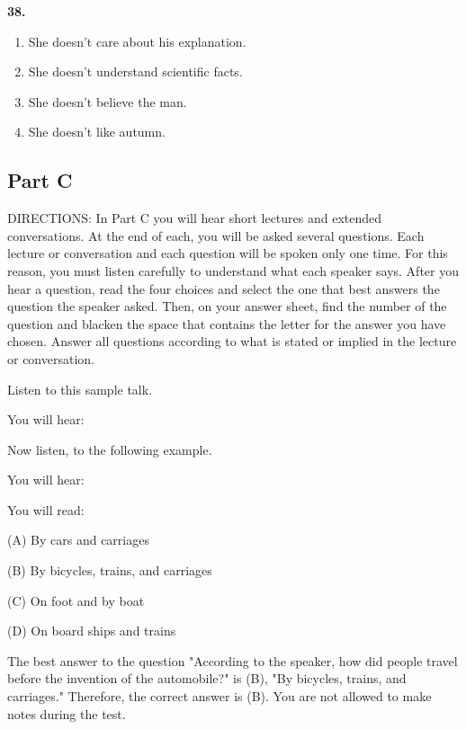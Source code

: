 \documentclass[12pt]{article}
\begin{document}
\par
\vspace{0.25\baselineskip}
\noindent\textbf{38.}
\begin{enumerate}[label=(\Alph*),leftmargin=*,itemsep=0.2em]
\item She doesn't care about his explanation.
\item She doesn't understand scientific facts.
\item She doesn't believe the man.
\item She doesn't like autumn.
\end{enumerate}
\par
\vspace{0.25\baselineskip}
\subsection*{Part C}
DIRECTIONS: In Part C you will hear short lectures and extended conversations. At the end of each, you will be asked several questions. Each lecture or conversation and each question will be spoken only one time. For this reason, you must listen carefully to understand what each speaker says. After you hear a question, read the four choices and select the one that best answers the question the speaker asked. Then, on your answer sheet, find the number of the question and blacken the space that contains the letter for the answer you have chosen. Answer all questions according to what is stated or implied in the lecture or conversation.\par
\begin{exampleblock}
Listen to this sample talk.\par
You will hear:\par
Now listen, to the following example.\par
You will hear:\par
You will read:\par
(A) By cars and carriages\par
(B) By bicycles, trains, and carriages\par
(C) On foot and by boat\par
(D) On board ships and trains\par
The best answer to the question "According to the speaker, how did people travel before the invention of the automobile?" is (B), "By bicycles, trains, and carriages." Therefore, the correct answer is (B). You are not allowed to make notes during the test.\par
\end{exampleblock}
\end{document}
